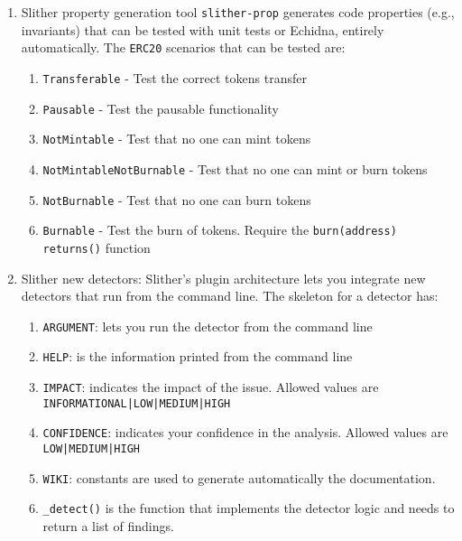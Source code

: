 \begin{enumerate}
\item Slither property generation tool \verb|slither-prop| generates code properties (e.g., invariants) that can be tested with unit tests or Echidna, entirely automatically. The \verb|ERC20| scenarios that can be tested are:
	\begin{enumerate}
	\item\verb|Transferable| - Test the correct tokens transfer
	\item\verb|Pausable| - Test the pausable functionality
	\item\verb|NotMintable| - Test that no one can mint tokens
	\item\verb|NotMintableNotBurnable| - Test that no one can mint or burn tokens
	\item\verb|NotBurnable| - Test that no one can burn tokens
	\item\verb|Burnable| - Test the burn of tokens. Require the \verb|burn(address) returns()| function
	\end{enumerate}

\item Slither new detectors: Slither’s plugin architecture lets you integrate new detectors that run from the command line. The skeleton for a detector has:
	\begin{enumerate}
	\item\verb|ARGUMENT|: lets you run the detector from the command line
	\item\verb|HELP|: is the information printed from the command line
	\item\verb|IMPACT|: indicates the impact of the issue. Allowed values are \verb!INFORMATIONAL|LOW|MEDIUM|HIGH!
	\item\verb|CONFIDENCE|: indicates your confidence in the analysis. Allowed values are \verb!LOW|MEDIUM|HIGH!
	\item\verb|WIKI|: constants are used to generate automatically the documentation.
	\item\verb|_detect()| is the function that implements the detector logic and needs to return a list of findings.
	\end{enumerate}


\end{enumerate}
